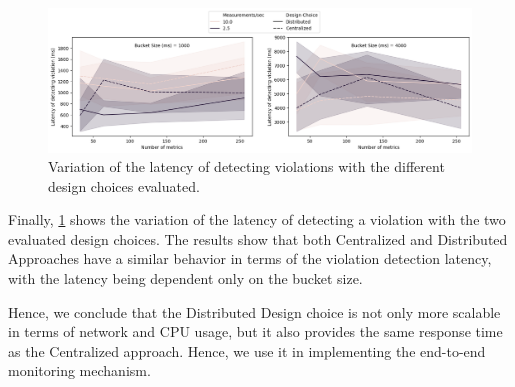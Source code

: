 \begin{figure}
\centering
\includegraphics[width=\linewidth]{figures/design_space/monitoring/response_time.png}
\caption{Variation of the latency of detecting violations with the different design choices evaluated.}
\label{fig:monitoring_response_time}
\end{figure}
Finally, \cref{fig:monitoring_response_time} shows the variation of the latency of detecting a violation with the two evaluated design choices. The results show that both Centralized and Distributed Approaches have a similar behavior in terms of the violation detection latency, with the latency being dependent only on the bucket size. 
\par Hence, we conclude that the Distributed Design choice is not only more scalable in terms of network and CPU usage, but it also provides the same response time as the Centralized approach. Hence, we use it in implementing the end-to-end monitoring mechanism.